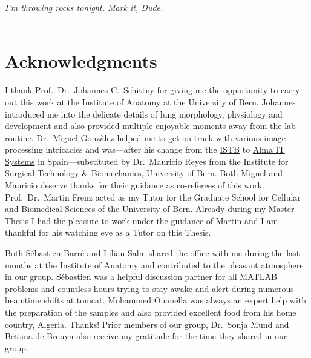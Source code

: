
\begin{flushright}{\slshape I'm throwing rocks tonight. Mark it, Dude.} \\ \medskip
    ---  \citep{TheBigLebowski}
\end{flushright}

\bigskip
\begingroup
\let\clearpage\relax
\let\cleardoublepage\relax
\let\cleardoublepage\relax
\chapter*{Acknowledgments}
I thank Prof.\ Dr.\ Johannes C.\ Schittny for giving me the opportunity to carry out this work at the Institute of Anatomy at the University of Bern. Johannes introduced me into the delicate details of lung morphology, physiology and development and also provided multiple enjoyable moments away from the lab routine. Dr.\ Miguel Gonzàlez helped me to get on track with various image processing intricacies and was---after his  change from the \href{http://www.istb.unibe.ch/}{ISTB} to \href{http://www.alma3d.com/en}{Alma IT Systems} in Spain---substituted by Dr.\ Mauricio Reyes from the Institute for Surgical Technology \& Biomechanics, University of Bern. Both Miguel and Mauricio deserve thanks for their guidance as co-referees of this work. Prof.\ Dr.\ Martin Frenz acted as my Tutor for the Graduate School for Cellular and Biomedical Sciences of the University of Bern. Already during my Master Thesis I had the pleasure to work under the guidance of  Martin and I am thankful for his watching eye as a Tutor on this Thesis.

Both Sébastien Barré and Lilian Salm shared the office with me during the last months at the Institute of Anatomy and contributed to the pleasant atmosphere in our group. Sébastien was a helpful discussion partner for all MATLAB problems and countless hours trying to stay awake and alert during numerous beamtime shifts at \acs{tomcat}. Mohammed Ouanella was always an expert help with the preparation of the samples and also provided excellent food from his home country, Algeria. Thanks! Prior members of our group, Dr.\ Sonja Mund and Bettina de Breuyn also receive my gratitude for the time they shared in our group.

